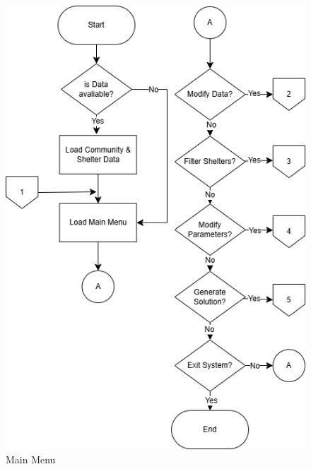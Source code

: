 \begin{appendices}
\begin{centerappendixtitle}
		\begin{figure}[h]
			\centering
			\caption{Main Menu}
			\label{systemFlow}
			\includegraphics[scale=0.7]{appendix/system f}
		\end{figure}
		

\end{centerappendixtitle}
\end{appendices}
